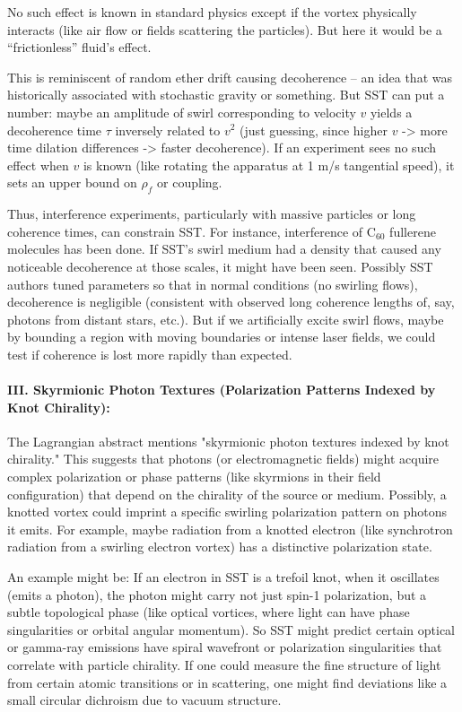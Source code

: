 \documentclass[10pt,reprint,aps,onecolumn,nofootinbib]{revtex4-2}
\newcommand{\rhoF}{\rho_{\!f}}     %
\begin{document}
No such effect is known in standard physics except if the vortex physically interacts (like air flow or fields scattering the particles). But here it would be a “frictionless” fluid’s effect.


This is reminiscent of random ether drift causing decoherence – an idea that was historically associated with stochastic gravity or something. But SST can put a number: maybe an amplitude of swirl corresponding to velocity $v$ yields a decoherence time $\tau$ inversely related to $v^2$ (just guessing, since higher $v$ -> more time dilation differences -> faster decoherence). If an experiment sees no such effect when $v$ is known (like rotating the apparatus at 1 m/s tangential speed), it sets an upper bound on $\rhoF$ or coupling.


Thus, interference experiments, particularly with massive particles or long coherence times, can constrain SST. For instance, interference of C$_{60}$ fullerene molecules has been done. If SST’s swirl medium had a density that caused any noticeable decoherence at those scales, it might have been seen. Possibly SST authors tuned parameters so that in normal conditions (no swirling flows), decoherence is negligible (consistent with observed long coherence lengths of, say, photons from distant stars, etc.). But if we artificially excite swirl flows, maybe by bounding a region with moving boundaries or intense laser fields, we could test if coherence is lost more rapidly than expected.


\paragraph{III. Skyrmionic Photon Textures (Polarization Patterns Indexed by Knot Chirality):}

The Lagrangian abstract mentions "skyrmionic photon textures indexed by knot chirality." This suggests that photons (or electromagnetic fields) might acquire complex polarization or phase patterns (like skyrmions in their field configuration) that depend on the chirality of the source or medium. Possibly, a knotted vortex could imprint a specific swirling polarization pattern on photons it emits. For example, maybe radiation from a knotted electron (like synchrotron radiation from a swirling electron vortex) has a distinctive polarization state.


An example might be: If an electron in SST is a trefoil knot, when it oscillates (emits a photon), the photon might carry not just spin-1 polarization, but a subtle topological phase (like optical vortices, where light can have phase singularities or orbital angular momentum). So SST might predict certain optical or gamma-ray emissions have spiral wavefront or polarization singularities that correlate with particle chirality. If one could measure the fine structure of light from certain atomic transitions or in scattering, one might find deviations like a small circular dichroism due to vacuum structure.
\end{document}
